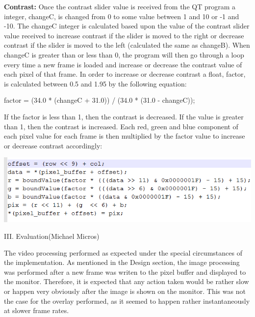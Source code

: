 \documentclass{article}
\newenvironment{Figure}
  {\par\medskip\noindent\ignorespaces\minipage{\linewidth}}
  {\endminipage\par\medskip}
\begin{document}
\begin{multicols*}{2}
{\bf  Contrast: }
Once the contrast slider value is received from the QT program a integer, changeC, is changed from 0 to some value between 1 and 10 or -1 and -10. The changeC integer is calculated based upon the value of the contrast slider value received to increase contrast if the slider is moved to the right or decrease contrast if the slider is moved to the left (calculated the same as changeB).
When changeC is greater than or less than 0, the program will then go through a loop every time a new frame is loaded and increase or decrease the contrast value of each pixel of that frame. In order to increase or decrease contrast a float, factor, is calculated between 0.5 and 1.95 by the following equation:

factor = (34.0 * (changeC + 31.0)) / (34.0 * (31.0 - changeC));

If the factor is less than 1, then the contrast is decreased. If the value is greater than 1, then the contrast is increased. Each red, green and blue component of each pixel value for each frame is then multiplied by the factor value to increase or decrease contrast accordingly:

\begin{Figure}
 \centering
 \includegraphics[width=\linewidth]{ccode4.png}
\end{Figure}


\begin{center}
\large{III. Evaluation(Michael Micros)}
\end{center}

The video processing performed as expected under the special circumstances of the implementation. As mentioned in the Design section, the image processing was performed after a new frame was writen to the pixel buffer and displayed to the monitor. Therefore, it is expected that any action taken would be rather slow or happen very obviously after the image is shown on the monitor. This was not the case for the overlay performed, as it seemed to happen rather instantaneously at slower frame rates.


\end{multicols*}
\end{document}
